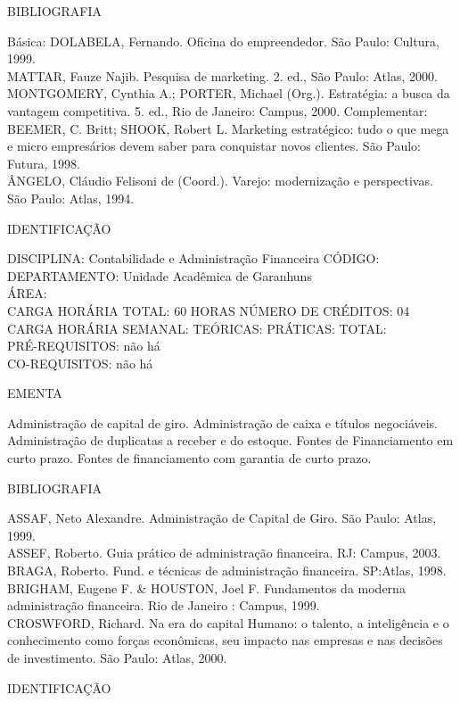 \documentclass[
	12pt,				%
	openright,			%
  oneside,     %
	a4paper,			%
	chapter=TITLE,		%
	english,			%
	french,				%
	spanish,			%
	brazil				%
	]{abntex2}
\begin{document}
\begin{apendicesenv}
BIBLIOGRAFIA 

Básica:
DOLABELA, Fernando. Oficina do empreendedor. São Paulo: Cultura, 1999.\\
MATTAR, Fauze Najib. Pesquisa de marketing. 2. ed., São Paulo: Atlas,
2000.\\
MONTGOMERY, Cynthia A.; PORTER, Michael (Org.). Estratégia: a busca da
vantagem competitiva. 5. ed., Rio de Janeiro: Campus, 2000.
Complementar:\\
BEEMER, C. Britt; SHOOK, Robert L. Marketing estratégico: tudo o que
mega e micro empresários devem saber para conquistar novos clientes.
São Paulo: Futura, 1998.\\
ÂNGELO, Cláudio Felisoni de (Coord.). Varejo: modernização e
perspectivas. São Paulo: Atlas, 1994.

\newpage IDENTIFICAÇÃO

DISCIPLINA: Contabilidade e Administração Financeira CÓDIGO:\\ 
DEPARTAMENTO: Unidade Acadêmica de Garanhuns\\
ÁREA: \\
CARGA HORÁRIA TOTAL: 60 HORAS NÚMERO DE CRÉDITOS: 04\\
CARGA HORÁRIA SEMANAL: TEÓRICAS: PRÁTICAS: TOTAL: \\
PRÉ-REQUISITOS: não há\\
CO-REQUISITOS: não há

EMENTA 

Administração de capital de giro. Administração de caixa e títulos
negociáveis. Administração de duplicatas a receber e do estoque. Fontes
de Financiamento em curto prazo. Fontes de financiamento com garantia
de curto prazo.

BIBLIOGRAFIA 

ASSAF, Neto Alexandre. Administração de Capital de Giro. São Paulo:
Atlas, 1999.\\
ASSEF, Roberto. Guia prático de administração financeira. RJ: Campus,
2003.\\
BRAGA, Roberto. Fund. e técnicas de administração financeira. SP:Atlas,
1998.\\
BRIGHAM, Eugene F. \& HOUSTON, Joel F. Fundamentos da moderna
administração financeira. Rio de Janeiro : Campus, 1999.\\
CROSWFORD, Richard. Na era do capital Humano: o talento, a inteligência
e o conhecimento como forças econômicas, seu impacto nas empresas e nas
decisões de investimento. São Paulo: Atlas, 2000.

\newpage IDENTIFICAÇÃO


\end{apendicesenv}
\end{document}
